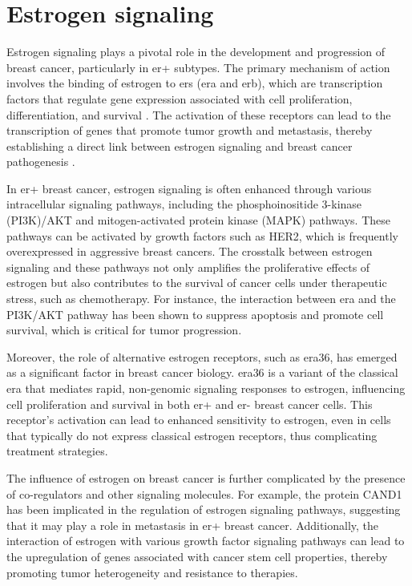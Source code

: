 \section{Estrogen signaling}
\label{sec:estrogen_signaling}

Estrogen signaling plays a pivotal role in the development and progression of
breast cancer, particularly in \gls{er+} subtypes.
The primary mechanism of action involves the binding of estrogen to \glspl{er}
(\gls{era} and \gls{erb}), which are transcription factors that regulate gene
expression associated with cell proliferation, differentiation, and survival
\supercite{misawa_estrogen-related_2015,lattouf_lkb1_2016}.
The activation of these receptors can lead to the transcription of genes that
promote tumor growth and metastasis, thereby establishing a direct link between
estrogen signaling and breast cancer pathogenesis
\supercite{feng_cross-talk_2020}.

In \gls{er+} breast cancer, estrogen signaling is often enhanced through
various intracellular signaling pathways, including the phosphoinositide
3-kinase (PI3K)/AKT and mitogen-activated protein kinase (MAPK) pathways.
These pathways can be activated by growth factors such as HER2, which is
frequently overexpressed in aggressive breast
cancers\supercite{bratton_regulation_2010,salmeron-hernandez_bcas2_2019}.
The crosstalk between estrogen signaling and these pathways not only amplifies
the proliferative effects of estrogen but also contributes to the survival of
cancer cells under therapeutic stress, such as
chemotherapy\supercite{bratton_regulation_2010,george_hypoxia_2012}.
For instance, the interaction between \gls{era} and the PI3K/AKT pathway has
been shown to suppress apoptosis and promote cell survival, which is critical
for tumor progression\supercite{bratton_regulation_2010,george_hypoxia_2012}.

Moreover, the role of alternative estrogen receptors, such as \gls{era}36, has
emerged as a significant factor in breast cancer biology.
\gls{era}36 is a variant of the classical \gls{era} that mediates
rapid, non-genomic signaling responses to estrogen, influencing cell
proliferation and survival in both \gls{er+} and \gls{er-} breast cancer
cells\supercite{deng_er-36-mediated_2014,zhang_positive_2011}.
This receptor's activation can lead to enhanced sensitivity to estrogen, even
in cells that typically do not express classical estrogen receptors, thus
complicating treatment strategies\supercite{zhang_positive_2011}.

The influence of estrogen on breast cancer is further complicated by the
presence of co-regulators and other signaling molecules.
For example, the protein CAND1 has been implicated in the regulation of
estrogen signaling pathways, suggesting that it may play a role in metastasis
in \gls{er+} breast cancer\supercite{alhammad_bioinformatics_2022}.
Additionally, the interaction of estrogen with various growth factor signaling
pathways can lead to the upregulation of genes associated with cancer stem cell
properties, thereby promoting tumor heterogeneity and resistance to
therapies\supercite{fillmore_estrogen_2010,xue_sox9fxyd3src_2019}.
